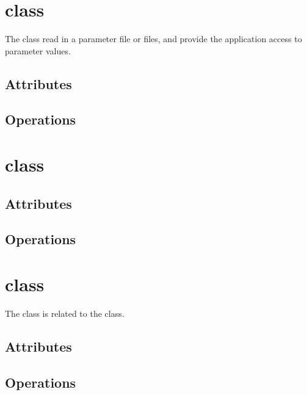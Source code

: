 \section{ class}

The  class read in a parameter file or files, and
provide the application access to parameter values.


\subsection{Attributes}

\subsection{Operations}

\section{ class}


\subsection{Attributes}

\subsection{Operations}

\section{ class}

The  class is related to the  class.


\subsection{Attributes}

\subsection{Operations}

